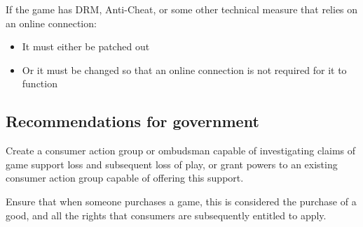 If the game has DRM, Anti-Cheat, or some other technical measure that relies on an online connection:
\begin{itemize}
    \item It must either be patched out
    \item Or it must be changed so that an online connection is not required for it to function
\end{itemize}


\subsection{Recommendations for government}

Create a consumer action group or ombudsman capable of investigating claims of game support loss and subsequent loss of play,
or grant powers to an existing consumer action group capable of offering this support.

Ensure that when someone purchases a game, this is considered the purchase of a good, and all the rights that consumers are subsequently entitled to apply.

